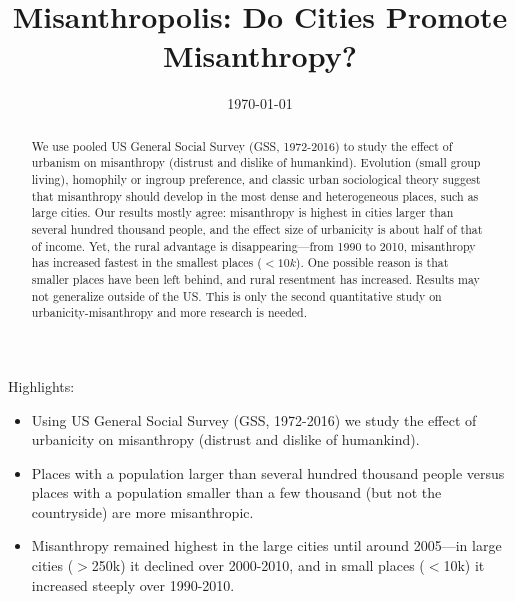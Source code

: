 \documentclass[11pt, letterpaper]{article}
\date{{}\today \hspace{.2in}\xxivtime}
\title{  %
\vspace{-.5in}  Misanthropolis: Do Cities Promote Misanthropy?
%
}
\author{
}
\begin{document}


\maketitle
\vspace{-.4in}
\begin{center}

\end{center}


Highlights:
\begin{itemize}
\item Using US General Social Survey (GSS, 1972-2016) we study the effect of
  urbanicity on misanthropy (distrust and dislike of humankind).
\item  Places with a population larger than several hundred thousand people  versus  places with a population smaller than a few thousand (but not the countryside) are more misanthropic.
\item Misanthropy remained highest in the large cities until around 2005---in
  large cities ($>$250k) it declined over 2000-2010, and  in small places
  ($<$10k)  it increased steeply over 1990-2010.
\end{itemize}


\begin{abstract}
\noindent 
We use pooled US General Social Survey (GSS, 1972-2016)  to study  
the effect of urbanism on misanthropy (distrust and dislike of humankind). 
Evolution  (small group living),  homophily or ingroup preference, and classic urban sociological theory  suggest that misanthropy should develop in the most dense and
heterogeneous places, such as large cities. Our results mostly agree:
misanthropy is highest in cities larger than several hundred thousand people, and the effect size of urbanicity is about half of that of
 income. 
Yet, the rural advantage is disappearing---from 1990 to  2010, misanthropy has
increased fastest in the smallest places ($<10k$). One possible reason  is that smaller places have been left behind, and rural resentment has increased. Results may not 
generalize outside of the US. This is only the second quantitative study on urbanicity-misanthropy and more research is needed.
\end{abstract}
\end{document}
